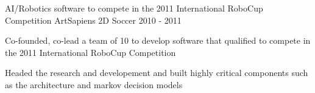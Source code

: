 \begin{cventries}
    



  \cventry
    {AI/Robotics software to compete in the 2011 International RoboCup Competition} %
    {ArtSapiens 2D Soccer} %
    {} %
    {2010 - 2011} %
    {
          \begin{cvitems} %
			\item {Co-founded, co-lead a team of 10 to develop software that qualified to compete in the 2011 International RoboCup Competition}
			\item {Headed the research and developement and built highly critical components such as the architecture and markov decision models}
	      \end{cvitems}
    }
    
    

\end{cventries}
